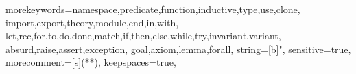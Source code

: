

\newcommand{\why}{\textsf{Why3}\xspace}
\newcommand{\whyml}{\textsf{WhyML}\xspace}
\newcommand{\eg}{\emph{e.g.}\xspace}
\newcommand{\ie}{\emph{i.e.}\xspace}

\newcommand{\keyword}[1]{\texttt{#1}}
\newcommand{\indextt}[1]{\index{#1@\protect\keyword{#1}}}
\newcommand{\indexttbs}[1]{\index{#1@\protect\keywordbs{#1}}}
\newif\ifspace
\newif\ifnewentry
\newcommand{\addspace}{\ifspace ~ \spacefalse \fi}
\newcommand{\term}[2]{\addspace\mbox{\lstinline|#1|%
\ifthenelse{\equal{#2}{}}{}{\indexttbase{#2}{#1}}}\spacetrue}
\newcommand{\nonterm}[2]{%
  \ifthenelse{\equal{#2}{}}%
             {\addspace\mbox{\textsl{#1}\ifnewentry\index{#1@\textsl{#1}}\fi}\spacetrue}%
             {\addspace\mbox{\textsl{#1}\footnote{#2}\ifnewentry\index{grammar entries!\textsl{#1}}\fi}\spacetrue}}
\newcommand{\repetstar}{$^*$\spacetrue}
\newcommand{\repetplus}{$^+$\spacetrue}
\newcommand{\repetone}{$^?$\spacetrue}
\newcommand{\lparen}{\addspace(}
\newcommand{\rparen}{)}
\newcommand{\orelse}{\addspace$\mid$\spacetrue}
\newcommand{\sep}{ \\[2mm] \spacefalse\newentrytrue}
\newcommand{\newl}{ \\ & & \spacefalse}
\newcommand{\alt}{ \\ & $\mid$ & \spacefalse}
\newcommand{\is}{ & $::=$ & \spacefalse\newentryfalse}
\newenvironment{syntax}{\begin{tabular}{@{}rrll@{}}\spacefalse\newentrytrue}{\end{tabular}}
\newcommand{\synt}[1]{$\spacefalse#1$}
\newcommand{\emptystring}{$\epsilon$}
\newcommand{\below}{See\; below}


\RequirePackage{listings}
\RequirePackage{amssymb}


{
morekeywords={namespace,predicate,function,inductive,type,use,clone,%
import,export,theory,module,end,in,with,%
let,rec,for,to,do,done,match,if,then,else,while,try,invariant,variant,%
absurd,raise,assert,exception,%
goal,axiom,lemma,forall},%
string=[b]",%
sensitive=true,%
morecomment=[s]{(*}{*)},%
keepspaces=true,
}


